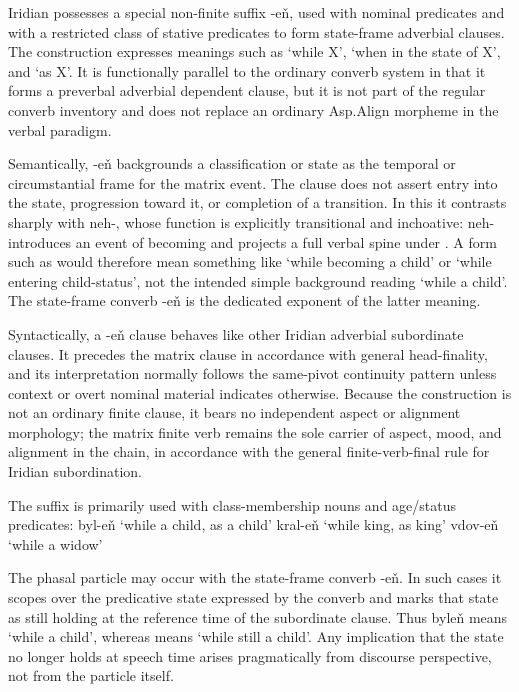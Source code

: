 Iridian possesses a special non-finite suffix -eň, used with nominal predicates
and with a restricted class of stative predicates to form state-frame adverbial
clauses. The construction expresses meanings such as ‘while X’, ‘when in the
state of X’, and ‘as X’. It is functionally parallel to the ordinary converb
system in that it forms a preverbal adverbial dependent clause, but it is not
part of the regular converb inventory and does not replace an ordinary Asp.Align
morpheme in the verbal paradigm.

Semantically, -eň backgrounds a classification or state as the temporal or
circumstantial frame for the matrix event. The clause does not assert entry into
the state, progression toward it, or completion of a transition. In this it
contrasts sharply with neh-, whose function is explicitly transitional and
inchoative: neh- introduces an event of becoming and projects a full verbal
spine under . A form such as  would therefore mean
something like ‘while becoming a child’ or ‘while entering child-status’, not
the intended simple background reading ‘while a child’. The state-frame converb
-eň is the dedicated exponent of the latter meaning.

Syntactically, a -eň clause behaves like other Iridian adverbial subordinate
clauses. It precedes the matrix clause in accordance with general head-finality,
and its interpretation normally follows the same-pivot continuity pattern unless
context or overt nominal material indicates otherwise. Because the construction
is not an ordinary finite clause, it bears no independent aspect or alignment
morphology; the matrix finite verb remains the sole carrier of aspect, mood, and
alignment in the chain, in accordance with the general finite-verb-final rule
for Iridian subordination.


The suffix is primarily used with class-membership nouns and age/status
predicates: byl-eň ‘while a child, as a child’ kral-eň ‘while king, as king’
vdov-eň ‘while a widow’

The phasal particle  may occur with the state-frame converb -eň. In such cases
it scopes over the predicative state expressed by the converb and marks that
state as still holding at the reference time of the subordinate clause. Thus
byleň means ‘while a child’, whereas  means ‘while still a child’. Any
implication that the state no longer holds at speech time arises pragmatically
from discourse perspective, not from the particle itself.


